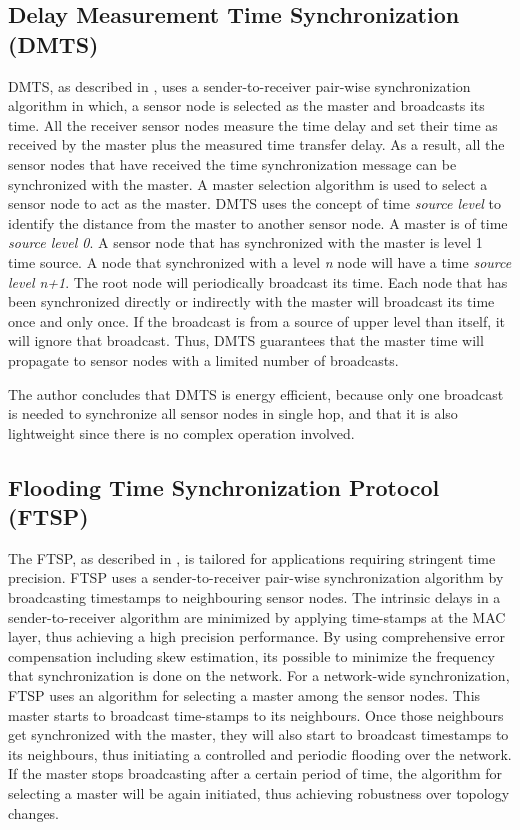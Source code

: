 \subsection{Delay Measurement Time Synchronization (DMTS)}
\ac{DMTS}, as described in \cite{ping03}, uses a sender-to-receiver pair-wise synchronization algorithm in which, a sensor node is selected as the master and broadcasts its time. All the receiver
sensor nodes measure the time delay and set their time as received by the master plus the measured time transfer delay. As a result, all the sensor nodes that have received the time synchronization message can be synchronized with the master. A master selection algorithm is used to select a sensor node to act as the master. DMTS uses the concept of time \textit{source level} to identify the distance from the master to another sensor node. A master is of time \textit{source level 0}. A sensor node that has synchronized with the master is level 1 time source. A node that synchronized
with a level \textit{n} node will have a time \textit{source level n+1}. The root node will periodically  broadcast its time. Each node that has been synchronized directly or indirectly with the master will broadcast its time once and only once. If the broadcast is from a source of upper level than itself, it will ignore that broadcast. Thus, DMTS guarantees that the master time will propagate to sensor nodes with a limited number of broadcasts.

The author concludes that DMTS is energy efficient, because only one
broadcast is needed to synchronize all sensor nodes in single hop,
and that it is also lightweight since there is no complex operation
involved.

\subsection{Flooding Time Synchronization Protocol (FTSP)}
The \ac{FTSP}, as described in \cite{Maroti04:FTSP}, is tailored for applications requiring stringent time precision. FTSP uses a sender-to-receiver pair-wise synchronization algorithm by broadcasting timestamps to neighbouring sensor nodes. The intrinsic delays in a sender-to-receiver algorithm are minimized by applying time-stamps at the MAC layer, thus achieving a high precision performance. By using comprehensive error compensation including skew estimation, its possible to minimize the frequency that synchronization is done on the network. For a network-wide synchronization, FTSP uses an algorithm for selecting a master among the sensor nodes. This master starts to broadcast time-stamps to its neighbours. Once those neighbours get synchronized with the master, they will also start to broadcast timestamps to its neighbours, thus initiating a controlled and periodic flooding over the network. If the master stops broadcasting after a certain period of time, the algorithm for selecting a master will be again initiated, thus achieving robustness over topology changes.

